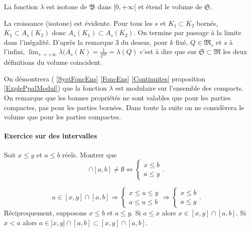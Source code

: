  \begin{propn}
  La fonction $\lambda$ est isotone de $\mathfrak{B}$ dans $[0, + \infty[$ et étend le volume de $\mathfrak{S}$.
 \end{propn}
 \begin{demo}
 La croissance (isotone) est évidente. Pour tous les $s$ et $K_1 \subset K_2$ bornés, $K_1 \subset A_s(K_2)$ donc $A_s(K_1) \subset A_s(K_2)$. On termine par passage à la limite dans l'inégalité.\newline
 D'après la remarque 3 du dessus, pour $k$ fixé, $Q\in \mathfrak{M}_s$ et $s$ à l'infini, $\lim_{s\rightarrow +\infty} \lambda(A_s(K) = \frac{1}{2^{nk}}=\lambda(Q)$ c'est à dire que sur $\mathfrak{S} \subset \mathfrak{M}$ les deux définitions du volume coincident.
 \end{demo}
 \noindent On démontrera ( \ref{SystFoncEns} \ref{FoncEns} \ref{Continuites} proposition \ref{ExplePpalModul}) que la fonction $\lambda$ est modulaire sur l'ensemble des compacts. On remarque que les bonnes propriétés ne sont valables que pour les parties compactes, pas pour les parties bornées. Dans toute la suite on ne considèrera le volume que pour les parties compactes.


 \paragraph{Exercice sur des intervalles}
 Soit $x\leq y$ et $a\leq b$ réels. Montrer que
 \begin{displaymath}
  [x,y] \cap [a,b] \neq \emptyset \Leftrightarrow
  \left\lbrace
  \begin{aligned}
    x \leq b \\
    a \leq y
  \end{aligned}
  \right. .
 \end{displaymath}
\begin{demo}
\begin{displaymath}
 u \in [x,y] \cap [a,b] \Rightarrow
 \left\lbrace
 \begin{aligned}
   x \leq u \leq y \\
   a \leq u \leq b
 \end{aligned}
 \right.
 \Rightarrow
\left\lbrace
 \begin{aligned}
   x \leq b  \\
   a \leq y
 \end{aligned}
 \right. .
 \end{displaymath}
 Réciproquement, supposons $x\leq b$ et $a \leq y$.\newline
 Si $a\leq x$ alors $x \in [x,y]\cap[a,b]$.\newline
 Si $x<a$ alors $a \in ]x,y]\cap [a,b] \subset [x,y]\cap[a,b]$.
\end{demo}


